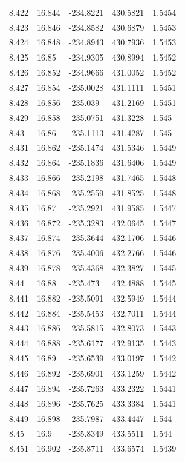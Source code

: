 \begin{tabular}{lllll}
8.422 & 16.844 & -234.8221 & 430.5821 & 1.5454 \\
8.423 & 16.846 & -234.8582 & 430.6879 & 1.5453 \\
8.424 & 16.848 & -234.8943 & 430.7936 & 1.5453 \\
8.425 & 16.85 & -234.9305 & 430.8994 & 1.5452 \\
8.426 & 16.852 & -234.9666 & 431.0052 & 1.5452 \\
8.427 & 16.854 & -235.0028 & 431.1111 & 1.5451 \\
8.428 & 16.856 & -235.039 & 431.2169 & 1.5451 \\
8.429 & 16.858 & -235.0751 & 431.3228 & 1.545 \\
8.43 & 16.86 & -235.1113 & 431.4287 & 1.545 \\
8.431 & 16.862 & -235.1474 & 431.5346 & 1.5449 \\
8.432 & 16.864 & -235.1836 & 431.6406 & 1.5449 \\
8.433 & 16.866 & -235.2198 & 431.7465 & 1.5448 \\
8.434 & 16.868 & -235.2559 & 431.8525 & 1.5448 \\
8.435 & 16.87 & -235.2921 & 431.9585 & 1.5447 \\
8.436 & 16.872 & -235.3283 & 432.0645 & 1.5447 \\
8.437 & 16.874 & -235.3644 & 432.1706 & 1.5446 \\
8.438 & 16.876 & -235.4006 & 432.2766 & 1.5446 \\
8.439 & 16.878 & -235.4368 & 432.3827 & 1.5445 \\
8.44 & 16.88 & -235.473 & 432.4888 & 1.5445 \\
8.441 & 16.882 & -235.5091 & 432.5949 & 1.5444 \\
8.442 & 16.884 & -235.5453 & 432.7011 & 1.5444 \\
8.443 & 16.886 & -235.5815 & 432.8073 & 1.5443 \\
8.444 & 16.888 & -235.6177 & 432.9135 & 1.5443 \\
8.445 & 16.89 & -235.6539 & 433.0197 & 1.5442 \\
8.446 & 16.892 & -235.6901 & 433.1259 & 1.5442 \\
8.447 & 16.894 & -235.7263 & 433.2322 & 1.5441 \\
8.448 & 16.896 & -235.7625 & 433.3384 & 1.5441 \\
8.449 & 16.898 & -235.7987 & 433.4447 & 1.544 \\
8.45 & 16.9 & -235.8349 & 433.5511 & 1.544 \\
8.451 & 16.902 & -235.8711 & 433.6574 & 1.5439 \\

\end{tabular}
